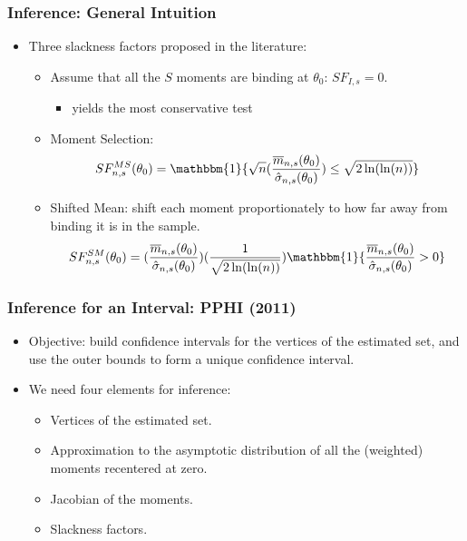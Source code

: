 \documentclass[notes=show]{beamer}
\begin{document}
\begin{frame}
\frametitle{Inference: General Intuition}

\begin{itemize}
\item Three slackness factors proposed in the literature: 

\begin{itemize}
\item Assume that all the $S$ moments are binding at $\theta_{0}$: $%
SF_{I,s}=0$. 

\begin{itemize}
\item yields the most conservative test 
\end{itemize}

\item Moment Selection:  
\begin{equation*}
SF^{MS}_{n,s}(\theta_{0})=\mathbbm{1}\{\sqrt{n}(\frac{\overline{m}%
_{n,s}(\theta_{0})}{\hat{\sigma }_{n,s}(\theta_{0})})\leq\sqrt{2\ln (\ln (n))%
}\}
\end{equation*}

\item Shifted Mean: shift each moment proportionately to how far away from
binding it is in the sample.  
\begin{equation*}
SF^{SM}_{n,s}(\theta_{0})=(\frac{\overline{m}_{n,s}(\theta_{0})}{\hat{\sigma}%
_{n,s}(\theta_{0})})(\frac{1}{\sqrt{2\ln(\ln (n))}})\mathbbm{1}\{\frac{%
\overline{m}_{n,s}(\theta_{0})}{\hat{\sigma}_{n,s}(\theta_{0})}>0\}
\end{equation*}
\end{itemize}
\end{itemize}
\end{frame}


\begin{frame}
\frametitle{Inference for an Interval: PPHI (2011)}

\begin{itemize}
\item Objective: build confidence intervals for the vertices of the
estimated set, and use the outer bounds to form a unique confidence
interval. 

\item We need four elements for inference: 

\begin{itemize}
\item Vertices of the estimated set. 

\item Approximation to the asymptotic distribution of all the (weighted)
moments recentered at zero. 

\item Jacobian of the moments. 

\item Slackness factors. 
\end{itemize}
\end{itemize}

\end{frame}
\end{document}
